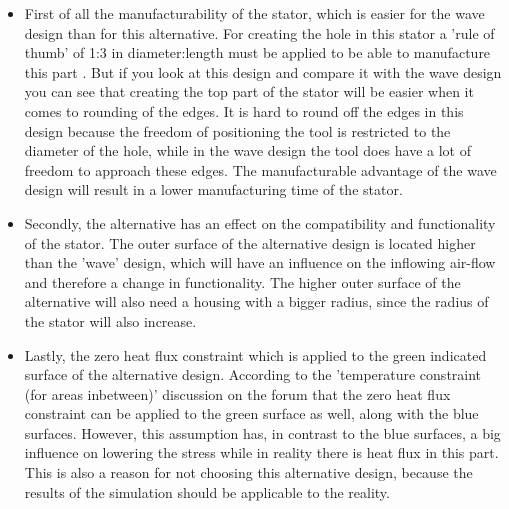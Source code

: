 \begin{itemize}
\item First of all the manufacturability of the stator, which is easier for the wave design than for this alternative. For creating the hole in this stator a 'rule of thumb' of 1:3 in diameter:length must be applied to be able to manufacture this part \cite{metalcutting}. But if you look at this design and compare it with the wave design you can see that creating the top part of the stator will be easier when it comes to rounding of the edges. It is hard to round off the edges in this design because the freedom of positioning the tool is restricted to the diameter of the hole, while in the wave design the tool does have a lot of freedom to approach these edges. The manufacturable advantage of the wave design will result in a lower manufacturing time of the stator.
\item Secondly, the alternative has an effect on the compatibility and functionality of the stator. The outer surface of the alternative design is located higher than the 'wave' design, which will have an influence on the inflowing air-flow and therefore a change in functionality. The higher outer surface  of the alternative will also need a housing with a bigger radius, since the radius of the stator will also increase.
\item Lastly, the zero heat flux constraint which is applied to the green indicated surface of the alternative design. According to the 'temperature constraint (for areas inbetween)' discussion on the forum that the zero heat flux constraint can be applied to the green surface as well, along with the blue surfaces. However, this assumption has, in contrast to the blue surfaces, a big influence on lowering the stress while in reality there is heat flux in this part. This is also a reason for not choosing this alternative design, because the results of the simulation should be applicable to the reality.  
\end{itemize}
\newpage
